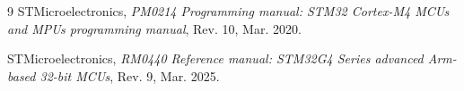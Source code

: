\documentclass[12pt,a4paper]{article}
\begin{document}

\tableofcontents
\newpage



\begin{thebibliography}{9}
STMicroelectronics, \textit{PM0214 Programming manual: STM32 Cortex-M4 MCUs and MPUs programming manual}, Rev. 10, Mar. 2020.

STMicroelectronics, \textit{RM0440 Reference manual: STM32G4 Series advanced Arm-based 32-bit MCUs}, Rev. 9, Mar. 2025.
\end{thebibliography}
\end{document}
